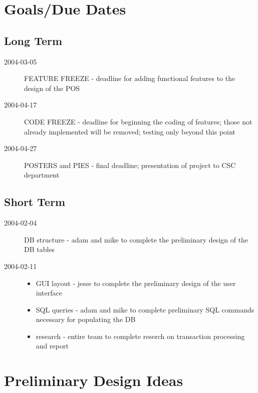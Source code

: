 \documentclass{article}
\begin{document}
\section{Goals/Due Dates}
\subsection{Long Term}

\begin{description}
    \item[2004-03-05] FEATURE FREEZE - deadline for adding functional features to the design of the POS
    \item[2004-04-17] CODE FREEZE - deadline for beginning the coding of features; those not already implemented will be removed; testing only beyond this point
    \item[2004-04-27] POSTERS and PIES - final deadline; presentation of project to CSC department
\end{description}

\subsection{Short Term}
\begin{description}
    \item[2004-02-04] DB structure - adam and mike to complete the preliminary design of the DB tables
    \item[2004-02-11]
    \begin{itemize}
        \item GUI layout - jesse to complete the preliminary design of the user interface
        \item SQL queries - adam and mike to complete preliminary SQL commands necessary for populating the DB
        \item research - entire team to complete reserch on transaction processing and report
    \end{itemize}
\end{description}

\section{Preliminary Design Ideas}
\end{document}
